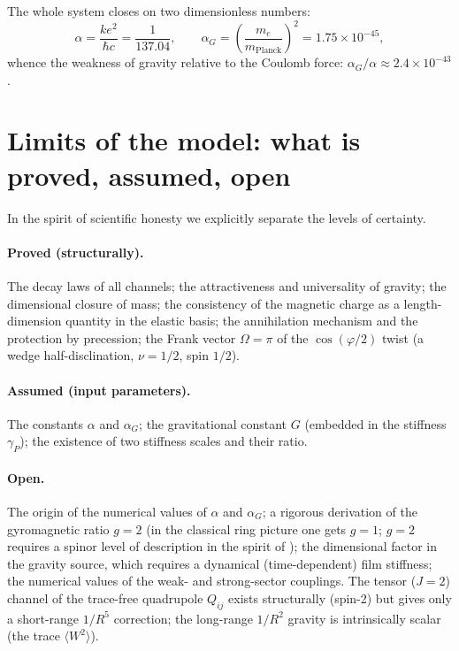 \documentclass[12pt,a4paper]{article}
\begin{document}
The whole system closes on two dimensionless numbers:
\begin{equation}
\alpha = \frac{k e^2}{\hbar c}=\frac{1}{137.04},\qquad
\alpha_G = \left(\frac{m_e}{m_{\text{Planck}}}\right)^2 = 1.75\times10^{-45},
\end{equation}
whence the weakness of gravity relative to the Coulomb force:
$\alpha_G/\alpha\approx 2.4\times10^{-43}$.

\section{Limits of the model: what is proved, assumed, open}
\label{sec:limits}
In the spirit of scientific honesty we explicitly separate the levels of
certainty.

\paragraph{Proved (structurally).} The decay laws of all channels; the
attractiveness and universality of gravity; the dimensional closure of mass;
the consistency of the magnetic charge as a length-dimension quantity in the
elastic basis; the annihilation mechanism and the protection by precession; the
Frank vector $\Omega=\pi$ of the $\cos(\varphi/2)$ twist (a wedge
half-disclination, $\nu=1/2$, spin $1/2$).

\paragraph{Assumed (input parameters).} The constants $\alpha$ and $\alpha_G$;
the gravitational constant $G$ (embedded in the stiffness $\gamma_P$); the
existence of two stiffness scales and their ratio.

\paragraph{Open.} The origin of the numerical values of $\alpha$ and
$\alpha_G$; a rigorous derivation of the gyromagnetic ratio $g=2$ (in the
classical ring picture one gets $g=1$; $g=2$ requires a spinor level of
description in the spirit of \cite{osipov2010}); the dimensional factor in the
gravity source, which requires a dynamical (time-dependent) film stiffness; the
numerical values of the weak- and strong-sector couplings. The tensor ($J=2$)
channel of the trace-free quadrupole $Q_{ij}$ exists structurally (spin-2) but
gives only a short-range $1/R^5$ correction; the long-range $1/R^2$ gravity is
intrinsically scalar (the trace $\langle W^2\rangle$).
\end{document}
